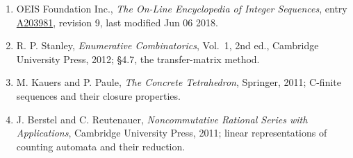 \documentclass[11pt]{article}
\theoremstyle{definition}
\begin{document}
\begin{enumerate}

\item OEIS Foundation Inc., \emph{The On-Line Encyclopedia of Integer Sequences}, entry \href{https://oeis.org/A203981}{A203981}, revision 9, last modified Jun 06 2018.

\item R. P. Stanley, \emph{Enumerative Combinatorics}, Vol.~1, 2nd ed., Cambridge University Press, 2012; \S4.7, the transfer-matrix method.

\item M. Kauers and P. Paule, \emph{The Concrete Tetrahedron}, Springer, 2011; C-finite sequences and their closure properties.

\item J. Berstel and C. Reutenauer, \emph{Noncommutative Rational Series with Applications}, Cambridge University Press, 2011; linear representations of counting automata and their reduction.

\end{enumerate}
\end{document}
